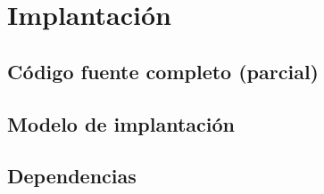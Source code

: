 \section{Implantación}
\subsection{Código fuente completo (parcial)}
\subsection{Modelo de implantación}
\subsection{Dependencias}